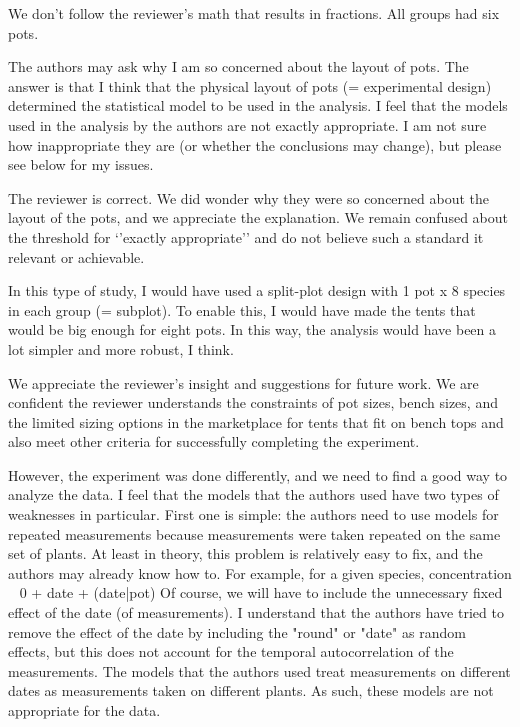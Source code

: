 \documentclass[parskip=half]{scrartcl}
\newcommand{\AR}[1]
	{\color{PineGreen}#1\color{black} \par }
\begin{document}
\AR{We don't follow the reviewer's math that results in fractions. All groups had six pots. }

The authors may ask why I am so concerned about the layout of pots. The answer is that I think that the physical layout of pots (= experimental design) determined the statistical model to be used in the analysis. I feel that the models used in the analysis by the authors are not exactly appropriate. I am not sure how inappropriate they are (or whether the conclusions may change), but please see below for my issues.

\AR{The reviewer is correct. We did wonder why they were so concerned about the layout of the pots, and we appreciate the explanation. We remain confused about the threshold for `'exactly appropriate'' and do not believe such a standard it relevant or achievable.  }

In this type of study, I would have used a split-plot design with 1 pot x 8 species in each group (= subplot). To enable this, I would have made the tents that would be big enough for eight pots. In this way, the analysis would have been a lot simpler and more robust, I think.

\AR{We appreciate the reviewer's insight and suggestions for future work. We are confident the reviewer understands the constraints of pot sizes, bench sizes, and the limited sizing options in the marketplace for tents that fit on bench tops and also meet other criteria for successfully completing the experiment.} 

However, the experiment was done differently, and we need to find a good way to analyze the data.
I feel that the models that the authors used have two types of weaknesses in particular.
First one is simple: the authors need to use models for repeated measurements because measurements were taken repeated on the same set of plants.
At least in theory, this problem is relatively easy to fix, and the authors may already know how to.
For example, for a given species, concentration ~ 0 + date + (date|pot)
Of course, we will have to include the unnecessary fixed effect of the date (of measurements).
I understand that the authors have tried to remove the effect of the date by including the "round" or "date" as random effects, but this does not account for the temporal autocorrelation of the measurements. The models that the authors used treat measurements on different dates as measurements taken on different plants. As such, these models are not appropriate for the data.
\end{document}
